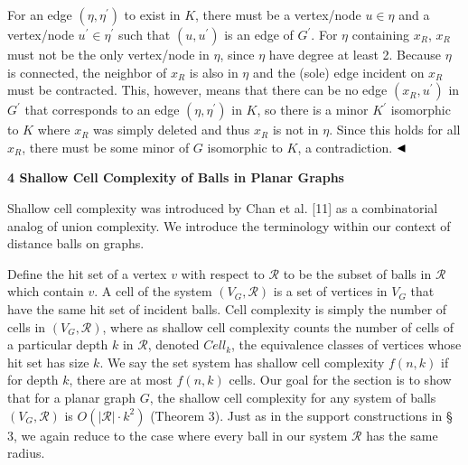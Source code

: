 \documentclass[10pt,a4paper]{article}
\begin{document}
For an edge $(\eta,\eta^{\prime})$ to exist in $K$, there must be a vertex/node $u\in\eta$ and a vertex/node $u^{\prime}\in\eta^{\prime}$ such that $(u,u^{\prime})$ is an edge of $G^{\prime}$. For $\eta$ containing $x_{R}$, $x_{R}$ must not be the only vertex/node in $\eta$, since $\eta$ have degree at least 2. Because $\eta$ is connected, the neighbor of $x_{R}$ is also in $\eta$ and the (sole) edge incident on $x_{R}$ must be contracted. This, however, means that there can be no edge $(x_{R},u^{\prime})$ in $G^{\prime}$ that corresponds to an edge $(\eta,\eta^{\prime})$ in $K$, so there is a minor $K^{\prime}$ isomorphic to $K$ where $x_{R}$ was simply deleted and thus $x_{R}$ is not in $\eta$. Since this holds for all $x_{R}$, there must be some minor of $G$ isomorphic to $K$, a contradiction. $\hfill\blacktriangleleft$
\par
\par
\par\medskip\noindent\textbf{4 Shallow Cell Complexity of Balls in Planar Graphs}\par
Shallow cell complexity was introduced by Chan et al. [11] as a combinatorial analog of union complexity. We introduce the terminology within our context of distance balls on graphs.
\par
\par
Define the hit set of a vertex $v$ with respect to $\mathcal{R}$ to be the subset of balls in $\mathcal{R}$ which contain $v$. A cell of the system $(V_{G},\mathcal{R})$ is a set of vertices in $V_{G}$ that have the same hit set of incident balls. Cell complexity is simply the number of cells in $(V_{G},\mathcal{R})$, where as shallow cell complexity counts the number of cells of a particular depth $k$ in $\mathcal{R}$, denoted $\mathit{Cell}_{k}$, the equivalence classes of vertices whose hit set has size $k$. We say the set system has shallow cell complexity $f(n,k)$ if for depth $k$, there are at most $f(n,k)$ cells. Our goal for the section is to show that for a planar graph $G$, the shallow cell complexity for any system of balls $(V_{G},\mathcal{R})$ is $O(|\mathcal{R}|\cdot k^{2})$ (Theorem 3). Just as in the support constructions in § 3, we again reduce to the case where every ball in our system $\mathcal{R}$ has the same radius.
\par
\par
\end{document}
